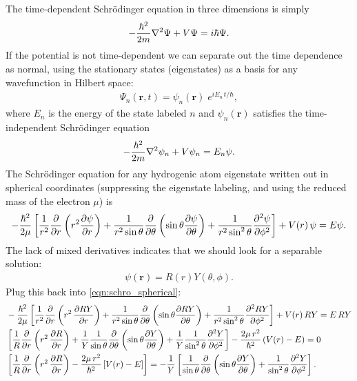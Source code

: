 \documentclass[12pt]{article}
\newcommand{\R}{\mathbf{r}}
\numberwithin{equation}{section}
\begin{document}
The time-dependent Schr\"{o}dinger equation in three dimensions is simply
\begin{align*}
- \frac{\hbar^2}{2m} \laplacian \Psi + V \Psi = i \hbar \Psi.
\end{align*}
If the potential is not time-dependent we can separate out the time dependence as normal, using the stationary states (eigenstates) as a basis for any wavefunction in Hilbert space:
\begin{align*}
\Psi_n(\R, t) = \psi_n(\R) \; e^{i E_n \, t / \hbar},
\end{align*}
where $E_n$ is the energy of the state labeled $n$ and $\psi_n(\R)$ satisfies the time-independent Schr\"{o}dinger equation
\begin{align*}
- \frac{\hbar^2}{2m} \laplacian \psi_n + V \psi_n = E_n \psi.
\end{align*}
The Schr\"{o}dinger equation for any hydrogenic atom eigenstate written out in spherical coordinates (suppressing the eigenstate labeling, and using the reduced mass of the electron $\mu$) is
\begin{align}\label{eqn:schro_spherical}
-\frac{\hbar^2}{2\mu} \left[\frac{1}{r^2} \pdv{}{r} \left(r^2 \pdv{\psi}{r}\right) + \frac{1}{r^2 \sin{\theta}} \pdv{}{\theta} \left(\sin{\theta} \pdv{\psi}{\theta}\right) + \frac{1}{r^2 \sin^2{\theta}} \pdv[2]{\psi}{\phi} \right] + V(r)\,\psi = E\psi.
\end{align}
The lack of mixed derivatives indicates that we should look for a separable solution:
\begin{align*}
\psi(\R) = R(r) Y(\theta, \phi).
\end{align*}
Plug this back into \eqref{eqn:schro_spherical}:
\begin{align*}
&-\frac{\hbar^2}{2\mu} \left[\frac{1}{r^2} \pdv{}{r} \left(r^2 \, \pdv{RY}{r}\right) + \frac{1}{r^2 \sin{\theta}} \pdv{}{\theta} \left(\sin{\theta} \pdv{RY}{\theta}\right) + \frac{1}{r^2 \sin^2{\theta}} \pdv[2]{RY}{\phi} \right] + V(r) \, RY = E \, RY \\
&\left[\frac{1}{R} \pdv{}{r} \left(r^2 \, \pdv{R}{r}\right) + \frac{1}{Y}\frac{1}{\sin{\theta}} \pdv{}{\theta} \left(\sin{\theta} \pdv{Y}{\theta}\right) + \frac{1}{Y} \frac{1}{\sin^2{\theta}} \pdv[2]{Y}{\phi} \right] - \frac{2\mu \, r^2}{\hbar^2} \left(V(r) - E\right) = 0 \\
&\left[\frac{1}{R}\pdv{}{r} \left(r^2 \, \pdv{R}{r}\right) - \frac{2\mu \, r^2}{\hbar^2} \left[V(r) - E\right] \right] = -\frac{1}{Y}\left[\frac{1}{\sin{\theta}} \pdv{}{\theta} \left(\sin{\theta} \pdv{Y}{\theta}\right) + \frac{1}{\sin^2{\theta}} \pdv[2]{Y}{\phi} \right].
\end{align*}
\end{document}
